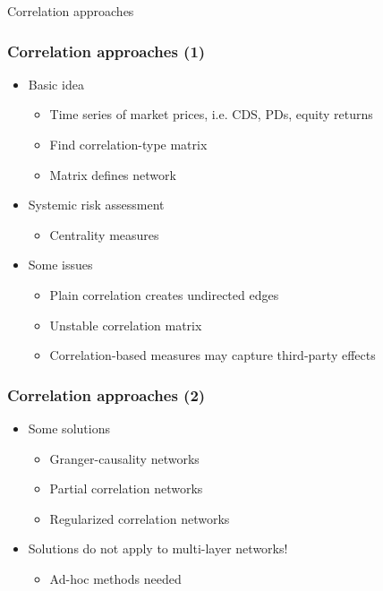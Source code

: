 \documentclass[aspectratio=43,dvipsnames,usenames, svgnames]{beamer}
\begin{document}
\begin{frame} %
\begin{center}
	\Large{Correlation approaches}
\end{center}
\end{frame}

\begin{frame} %
\frametitle{Correlation approaches (1)}
\begin{itemize}
	\item Basic idea
		\begin{itemize}
			\item Time series of market prices, i.e. CDS, PDs, equity returns
			\item Find correlation-type matrix
			\item Matrix defines network
		\end{itemize}
	\smallskip
	\item Systemic risk assessment
		\begin{itemize}
			\item Centrality measures
		\end{itemize}
	\smallskip
	\item Some issues
		\begin{itemize}
			\item Plain correlation creates undirected edges
			\item Unstable correlation matrix 
			\item Correlation-based measures may capture third-party effects
		\end{itemize}
\end{itemize}
\end{frame}

\begin{frame} %
\frametitle{Correlation approaches (2)}
\begin{itemize}
	\item Some solutions
		\begin{itemize}
			\item Granger-causality networks
			\item Partial correlation networks
			\item Regularized correlation networks
		\end{itemize}
	\smallskip
	\item Solutions do not apply to multi-layer networks!
		\begin{itemize}
			\item Ad-hoc methods needed
		\end{itemize}
\end{itemize}
\end{frame}
\end{document}
